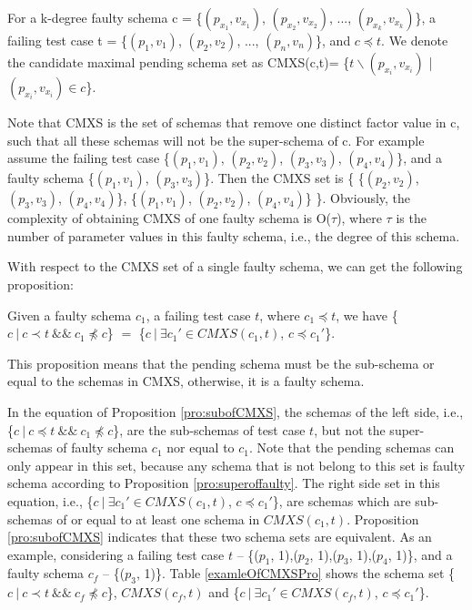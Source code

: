 \begin{definition}
For a k-degree faulty schema c = \{$(p_{x_{1}}, v_{x_{1}})$, $(p_{x_{2}}, v_{x_{2}})$, ..., $(p_{x_{k}}, v_{x_{k}})$\}, a failing test case t = \{$(p_{1}, v_{1})$, $(p_{2}, v_{2})$, ..., $(p_{n}, v_{n})$\}, and $c \preceq t$. We denote the candidate maximal pending schema set as CMXS(c,t)= \{$t \backslash (p_{x_{i}}, v_{x_{i}})$ | $(p_{x_{i}}, v_{x_{i}}) \in c $\}.
\end{definition}

Note that CMXS is the set of schemas that remove one distinct factor value in c, such that all these schemas will not be the super-schema of c. For example assume the failing test case \{$(p_{1}, v_{1})$, $(p_{2}, v_{2})$, $(p_{3}, v_{3})$, $(p_{4}, v_{4})$\}, and a faulty schema \{$(p_{1}, v_{1})$, $(p_{3}, v_{3})$\}. Then the CMXS set is \{ \{$(p_{2}, v_{2})$,  $(p_{3}, v_{3})$, $(p_{4}, v_{4})$\}, \{$(p_{1}, v_{1})$,  $(p_{2}, v_{2})$, $(p_{4}, v_{4})$\} \}. Obviously, the complexity of obtaining CMXS of one faulty schema is O($\tau$), where $\tau$ is the number of parameter values in this faulty schema, i.e., the degree of this schema.

With respect to the CMXS set of a single faulty schema, we can get the following proposition:


\begin{proposition}\label{pro:subofCMXS}
Given a faulty schema $c_{1}$, a failing test case $t$, where $c_{1} \preceq t$, we have \{$c\ |\ c \prec t\ \&\&\ c_{1} \npreceq c$\} $=$  \{$ c\ |\ \exists c_{1}' \in CMXS(c_{1}, t)$, $c \preceq c_{1}'$\}.
\end{proposition}

This proposition means that the pending schema must be the sub-schema or equal to the schemas in CMXS, otherwise, it is a faulty schema.

In the equation of Proposition \ref{pro:subofCMXS}, the schemas of the left side, i.e., \{$c\ |\ c \preceq t\ \&\&\ c_{1} \npreceq c$\}, are the sub-schemas of test case $t$, but not the super-schemas of faulty schema $c_{1}$ nor equal to $c_{1}$.  Note that the pending schemas can only appear in this set, because any schema that is not belong to this set is faulty schema according to Proposition \ref{pro:superoffaulty}. The right side set in this equation, i.e., \{$ c\ |\ \exists c_{1}' \in CMXS(c_{1}, t)$, $c \preceq c_{1}'$\}, are schemas which are sub-schemas of or equal to at least one schema in $CMXS(c_{1}, t)$. Proposition \ref{pro:subofCMXS} indicates that these two schema sets are equivalent. As an example, considering a failing test case $t$ -- \{($p_{1}$, 1),($p_{2}$, 1),($p_{3}$, 1),($p_{4}$, 1)\}, and a faulty schema $c_{f}$ --  \{($p_{3}$, 1)\}. Table \ref{examleOfCMXSPro} shows the schema set  \{$c\ |\ c \prec t\ \&\&\ c_{f} \npreceq c$\}, $CMXS(c_{f}, t)$ and \{$ c\ |\ \exists c_{1}' \in CMXS(c_{f}, t)$, $c \preceq c_{1}'$\}.

